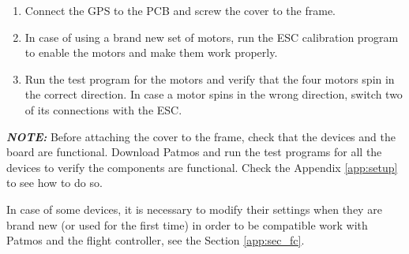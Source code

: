 \begin{enumerate}
    \item Connect the GPS to the PCB and screw the cover to the frame.
    
    \item In case of using a brand new set of motors, run the ESC calibration program to enable the motors and make them work properly.
    
    \item Run the test program for the motors and verify that the four motors spin in the correct direction. In case a motor spins in the wrong direction, switch two of its connections with the ESC.
    
\end{enumerate}

\textbf{\textit{NOTE:}} Before attaching the cover to the frame, check that the devices and the board are functional. Download Patmos and run the test programs for all the devices to verify the components are functional. Check the Appendix \ref{app:setup} to see how to do so.

In case of some devices, it is necessary to modify their settings when they are brand new (or used for the first time) in order to be compatible work with Patmos and the flight controller, see the Section \ref{app:sec_fc}.


